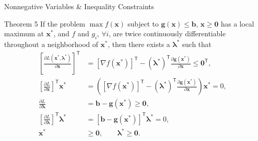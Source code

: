 \documentclass[aspectratio=169,hyperref,UTF8,CJK]{beamer}
\newcommand{\trans}{\mathsf{T}}
\newcommand{\vect}[1]{\boldsymbol{#1}}
\begin{document}
\begin{frame}{Nonnegative Variables \& Inequality Constraints}
  \scriptsize
  \begin{block}{Theorem 5}
    If the problem $\max f(\vect{x})$ subject to $\vect{g}(\vect{x})\le\vect{b}$, $\vect{x}\ge\vect{0}$ has a local maximum at $\vect{x}^{*}$, and $f$ and $g_i$, $\forall i$, are twice continuously differentiable throughout a neighborhood of $\vect{x}^{*}$, then there exists a $\vect{\lambda}^{*}$ such that
    \begin{align*}
      \left[\frac{\partial L(\vect{x}^{*},\vect{\lambda}^{*})}{\partial\vect{x}}\right]^{\trans}
        &=[\nabla f(\vect{x}^{*})]^{\trans}-(\vect{\lambda}^{*})^{\trans}
          \frac{\partial\vect{g}(\vect{x}^{*})}{\partial\vect{x}}\le\vect{0}^{\trans},\\
      \left[\frac{\partial L}{\partial\vect{x}}\right]^{\trans}\vect{x}^{*}
        &=\left([\nabla f(\vect{x}^{*})]^{\trans}-(\vect{\lambda}^{*})^{\trans}
          \frac{\partial\vect{g}(\vect{x}^{*})}{\partial\vect{x}}\right)\vect{x}^{*}=0,\\
      \frac{\partial L}{\partial\vect{\lambda}}
        &=\vect{b}-\vect{g}(\vect{x}^{*})\ge\vect{0},\\
      \left[\frac{\partial L}{\partial\vect{\lambda}}\right]^{\trans}\vect{\lambda}^{*}
        &=[\vect{b}-\vect{g}(\vect{x}^{*})]^{\trans}\vect{\lambda}^{*}=0,\\
      \vect{x}^{*}&\ge\vect{0},\qquad\vect{\lambda}^{*}\ge\vect{0}.
    \end{align*}
  \end{block}
\end{frame}
\end{document}
